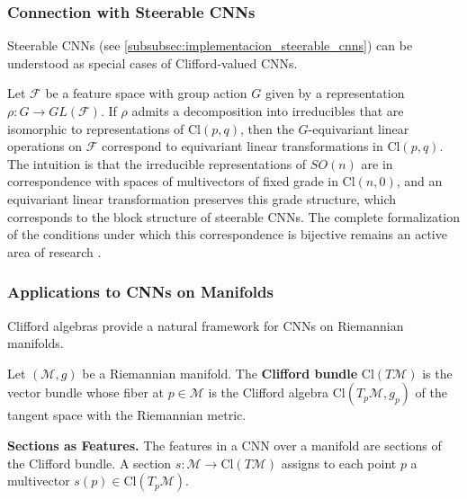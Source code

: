\subsubsection{Connection with Steerable CNNs}

Steerable CNNs (see \autoref{subsubsec:implementacion_steerable_cnns}) can be understood as special cases of Clifford-valued CNNs.

\begin{remark}\label{thm:equiv_steerable_clifford}
Let $\mathcal{F}$ be a feature space with group action $G$ given by a representation $\rho: G \to GL(\mathcal{F})$. If $\rho$ admits a decomposition into irreducibles that are isomorphic to representations of $\text{Cl}(p,q)$, then the $G$-equivariant linear operations on $\mathcal{F}$ correspond to equivariant linear transformations in $\text{Cl}(p,q)$. The intuition is that the irreducible representations of $SO(n)$ are in correspondence with spaces of multivectors of fixed grade in $\text{Cl}(n,0)$, and an equivariant linear transformation preserves this grade structure, which corresponds to the block structure of steerable CNNs. The complete formalization of the conditions under which this correspondence is bijective remains an active area of research \citep{brehmer2023geometric}.
\end{remark}

\subsubsection{Applications to CNNs on Manifolds}

Clifford algebras provide a natural framework for CNNs on Riemannian manifolds.

\begin{definition}\label{def:clifford_bundle}
Let $(\mathcal{M}, g)$ be a Riemannian manifold. The \textbf{Clifford bundle} $\text{Cl}(T\mathcal{M})$ is the vector bundle whose fiber at $p \in \mathcal{M}$ is the Clifford algebra $\text{Cl}(T_p\mathcal{M}, g_p)$ of the tangent space with the Riemannian metric.
\end{definition}

\textbf{Sections as Features.}\label{rem:secciones_clifford} The features in a CNN over a manifold are sections of the Clifford bundle. A section $s: \mathcal{M} \to \text{Cl}(T\mathcal{M})$ assigns to each point $p$ a multivector $s(p) \in \text{Cl}(T_p\mathcal{M})$.

